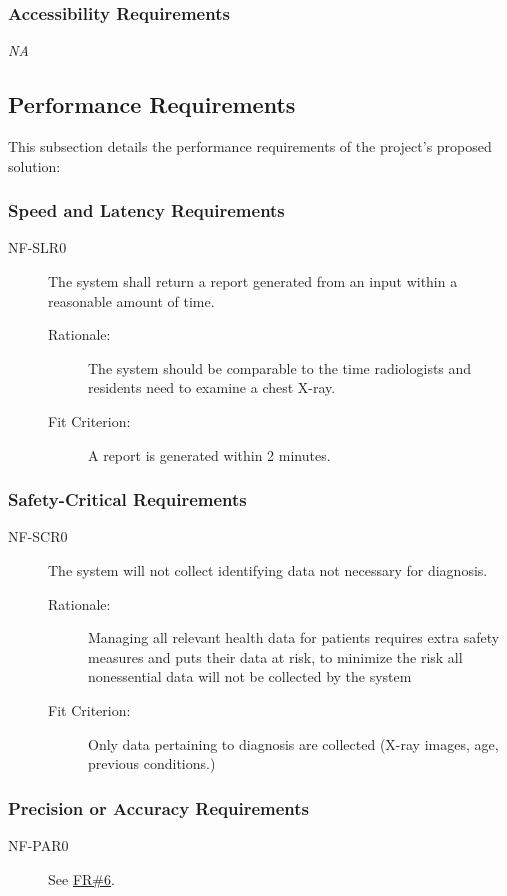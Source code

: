 \documentclass[12pt]{article}
\begin{document}
\subsubsection{Accessibility Requirements}
\textit{NA}

\subsection{Performance Requirements}
This subsection details the performance requirements of the project's proposed solution:

\subsubsection{Speed and Latency Requirements}
\begin{description}
    \item[NF-SLR0] The system shall return a report generated from an input within a reasonable amount of time. 
    \begin{description}
        \item[Rationale:] The system should be comparable to the time radiologists and residents need to examine a chest X-ray.  
        \item[Fit Criterion:] A report is generated within 2 minutes.
    \end{description}
\end{description}

\subsubsection{Safety-Critical Requirements}
\begin{description}
    \item[NF-SCR0]The system will not collect identifying data not necessary for diagnosis.
    \begin{description}
        \item[Rationale:] Managing all relevant health data for patients requires extra safety measures and puts their data at risk, to minimize the risk all nonessential data will not be collected by the system
        \item[Fit Criterion:] Only data pertaining to diagnosis are collected (X-ray images, age, previous conditions.)
    \end{description}
\end{description}

\subsubsection{Precision or Accuracy Requirements}
\begin{description}
    \item[NF-PAR0] See \hyperlink{FR6}{FR\#6}.
\end{description}
\end{document}
